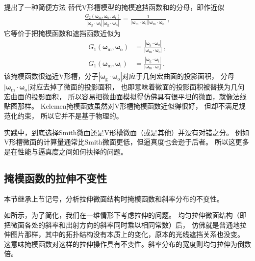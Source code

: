 \citet{10.2312/egs.20011003}提出了一种简便方法
替代V形槽模型的掩模遮挡函数和的分母，即作近似
\begin{align}
    \frac{G_2({\bm\omega}_{\mathrm{m}},{\bm\omega}_{\mathrm{o}},{\bm\omega}_{\mathrm{i}})}
    {|{\bm\omega}_{\mathrm{g}}\cdot{\bm\omega}_{\mathrm{i}}|
    |{\bm\omega}_{\mathrm{g}}\cdot{\bm\omega}_{\mathrm{o}}|}
    =\frac{1}{|{\bm\omega}_{\mathrm{m}}\cdot{\bm\omega}_{\mathrm{i}}|
    |{\bm\omega}_{\mathrm{m}}\cdot{\bm\omega}_{\mathrm{o}}|}\, ,
\end{align}
它等价于把掩模函数和遮挡函数近似为
\begin{align}
    G_1({\bm\omega}_{\mathrm{m}},{\bm\omega}_{\mathrm{o}}) & =
    \frac{|{\bm\omega}_{\mathrm{g}}\cdot{\bm\omega}_{\mathrm{o}}|}
    {|{\bm\omega}_{\mathrm{m}}\cdot{\bm\omega}_{\mathrm{o}}|}\, , \\
    G_1({\bm\omega}_{\mathrm{m}},{\bm\omega}_{\mathrm{i}}) & =
    \frac{|{\bm\omega}_{\mathrm{g}}\cdot{\bm\omega}_{\mathrm{i}}|}
    {|{\bm\omega}_{\mathrm{m}}\cdot{\bm\omega}_{\mathrm{i}}|}\, .
\end{align}
该掩模函数很逼近V形槽，分子$|{\bm\omega}_{\mathrm{g}}\cdot{\bm\omega}_{\mathrm{o}}|$对应于几何宏曲面的投影面积，
分母$|{\bm\omega}_{\mathrm{m}}\cdot{\bm\omega}_{\mathrm{o}}|$对应去掉了微面的投影面积，
也即意味着微面的投影面积被替换为几何宏曲面的投影面积，
所以容易把微曲面模拟得仿佛具有很平坦的微面，就像法线贴图那样。
Kelemen掩模函数虽然对V形槽掩模函数近似得很好，
但却不满足规范化约束，
所以它并不是基于物理的。

实践中，到底选择Smith微面还是V形槽微面（或是其他）并没有对错之分。
例如V形槽微面的计算量通常比Smith微面更低，但逼真度也会逊于后者。
所以这更多是在性能与逼真度之间如何抉择的问题。

\subsection{掩模函数的拉伸不变性}\label{sub:掩模函数的拉伸不变性}
本节继承上节记号，分析拉伸微面结构时掩模函数和斜率分布的不变性。

如所示，为了简化，我们在一维情形下考虑拉伸的问题。
均匀拉伸微面结构（即把微面各处的斜率和出射方向的斜率同时乘以相同常数）后，
仿佛就是普通地拉伸图片那样，其中的拓扑结构没有本质上的变化，原本的光线遮挡关系也没变。
这意味掩模函数对这样的拉伸操作具有不变性。斜率分布的宽度则均匀拉伸为倒数倍。

